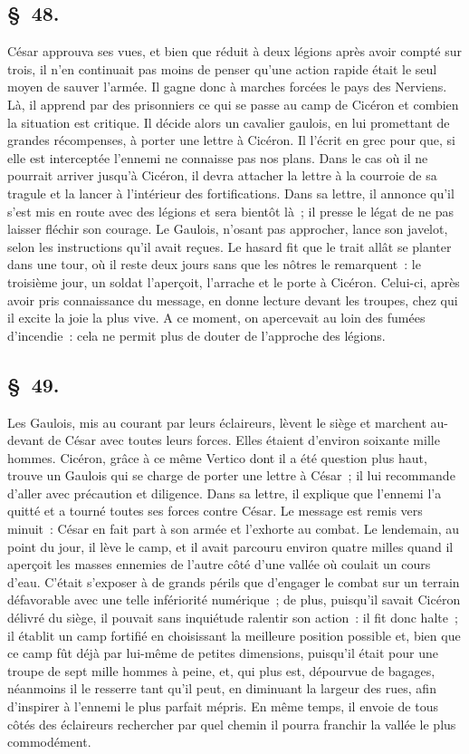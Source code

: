 \documentclass[french,twoside]{book} %
\begin{document}
\subsection[{§ 48.}]{ \textsc{§ 48.} }
\noindent César approuva ses vues, et bien que réduit à deux légions après avoir compté sur trois, il n’en continuait pas moins de penser qu’une action rapide était le seul moyen de sauver l’armée. Il gagne donc à marches forcées le pays des Nerviens. Là, il apprend par des prisonniers ce qui se passe au camp de Cicéron et combien la situation est critique. Il décide alors un cavalier gaulois, en lui promettant de grandes récompenses, à porter une lettre à Cicéron. Il l’écrit en grec pour que, si elle est interceptée l’ennemi ne connaisse pas nos plans. Dans le cas où il ne pourrait arriver jusqu’à Cicéron, il devra attacher la lettre à la courroie de sa tragule et la lancer à l’intérieur des fortifications. Dans sa lettre, il annonce qu’il s’est mis en route avec des légions et sera bientôt là ; il presse le légat de ne pas laisser fléchir son courage. Le Gaulois, n’osant pas approcher, lance son javelot, selon les instructions qu’il avait reçues. Le hasard fit que le trait allât se planter dans une tour, où il reste deux jours sans que les nôtres le remarquent : le troisième jour, un soldat l’aperçoit, l’arrache et le porte à Cicéron. Celui-ci, après avoir pris connaissance du message, en donne lecture devant les troupes, chez qui il excite la joie la plus vive. A ce moment, on apercevait au loin des fumées d’incendie : cela ne permit plus de douter de l’approche des légions.
\subsection[{§ 49.}]{ \textsc{§ 49.} }
\noindent Les Gaulois, mis au courant par leurs éclaireurs, lèvent le siège et marchent au-devant de César avec toutes leurs forces. Elles étaient d’environ soixante mille hommes. Cicéron, grâce à ce même Vertico dont il a été question plus haut, trouve un Gaulois qui se charge de porter une lettre à César ; il lui recommande d’aller avec précaution et diligence. Dans sa lettre, il explique que l’ennemi l’a quitté et a tourné toutes ses forces contre César. Le message est remis vers minuit : César en fait part à son armée et l’exhorte au combat. Le lendemain, au point du jour, il lève le camp, et il avait parcouru environ quatre milles quand il aperçoit les masses ennemies de l’autre côté d’une vallée où coulait un cours d’eau. C'était s’exposer à de grands périls que d’engager le combat sur un terrain défavorable avec une telle infériorité numérique ; de plus, puisqu’il savait Cicéron délivré du siège, il pouvait sans inquiétude ralentir son action : il fit donc halte ; il établit un camp fortifié en choisissant la meilleure position possible et, bien que ce camp fût déjà par lui-même de petites dimensions, puisqu’il était pour une troupe de sept mille hommes à peine, et, qui plus est, dépourvue de bagages, néanmoins il le resserre tant qu’il peut, en diminuant la largeur des rues, afin d’inspirer à l’ennemi le plus parfait mépris. En même temps, il envoie de tous côtés des éclaireurs rechercher par quel chemin il pourra franchir la vallée le plus commodément.
\end{document}
